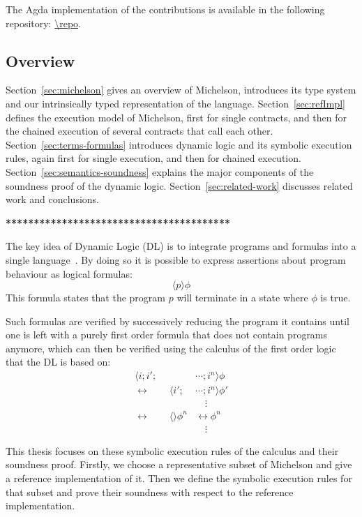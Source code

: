 The Agda implementation of the contributions is available in the
following repository: \url{\repo}. 

\subsection*{Overview}
\label{sec:overview}


Section~\ref{sec:michelson} gives an overview of Michelson, introduces
its type system and our intrinsically typed representation of the language.
Section~\ref{sec:refImpl} defines the execution model of Michelson,
first for single contracts, and then for the chained execution of
several contracts that call each other.
Section~\ref{sec:terms-formulas} introduces dynamic logic and its
symbolic execution rules, again first for single execution, and then
for chained execution.
Section~\ref{sec:semantics-soundness} explains the major components of
the soundness proof of the dynamic logic.
Section~\ref{sec:related-work} discusses related work and conclusions.


\textbf{****************************************}

The key idea of Dynamic Logic (DL) is to integrate programs and formulas
into a single language~\cite{KeY3}.
By doing so it is possible to express assertions about program behaviour as logical formulas:
\[	\langle p \rangle \phi	\]
This formula states that the program $p$ will terminate in a state where $\phi$ is true.

Such formulas are verified by successively reducing the program it contains
until one is left with a purely first order formula that does not contain programs anymore,
which can then be verified using the calculus of the first order logic that
the DL is based on:
\begin{align*}
					\langle i ; i' ; &\cdots ; i^n \rangle \phi
\\ \leftrightarrow	\qquad		\langle     i' ; &\cdots ; i^n \rangle \phi'
\\							 &\quad\vdots
\\ \leftrightarrow	\qquad	\langle \rangle \phi^n	 &\leftrightarrow \phi^n
\\							 &\quad\vdots
\end{align*}

This thesis focuses on these symbolic execution rules of the calculus and their soundness proof.
Firstly, we choose a representative subset of Michelson
and give a reference implementation of it.
Then we define the symbolic execution rules for that subset
and prove their soundness with respect to the reference implementation.

